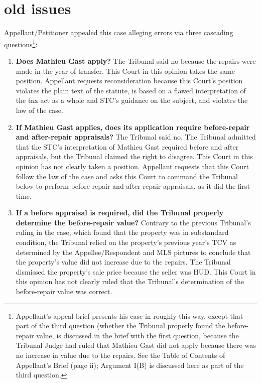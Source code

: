 \documentclass[12pt,\documentclassflag]{michiganCourtOfAppealsBrief}
\begin{document}
\section{old issues}

Appellant/Petitioner appealed this case alleging errors via three cascading questions\footnote{Appellant's appeal brief presents his case in roughly this way, except that part of the third question (whether the Tribunal properly found the before-repair value, is discussed in the brief with the first question, because the Tribunal Judge had ruled that Mathieu Gast did not apply because there was no increase in value due to the repairs. See the Table of Contents of Appellant's Brief (page ii); Argument I(B) is discussed here as part of the third question.}:

\begin{enumerate}
\item \textbf{Does Mathieu Gast apply?}
  The Tribunal said no because the repairs were made in the year of transfer.
  This Court in this opinion takes the same position. Appellant requests reconsideration because this Court's position violates the plain text of the statute, is based on a flawed interpretation of the tax act as a whole and STC's guidance on the subject, and violates the law of the case.
\item \textbf{If Mathieu Gast applies, does its application require before-repair and after-repair appraisals?}
The Tribunal said no. The Tribunal admitted that the STC's interpretation of Mathieu Gast required before and after appraisals, but the Tribunal claimed the right to disagree. This Court in this opinion has not clearly taken a position. Appellant requests that this Court follow the law of the case and asks this Court to command the Tribunal below to perform before-repair and after-repair appraisals, as it did the first time.
\item \textbf{If a before appraisal is required, did the Tribunal properly determine the before-repair value?}
  Contrary to the previous Tribunal's ruling in the case, which found that the property was in substandard condition, the Tribunal relied on the property's previous year's TCV as determined by the Appellee/Respondent and MLS pictures to conclude that the property's value did not increase due to the repairs. The Tribunal dismissed the property's sale price because the seller was HUD. This Court in this opinion has not clearly ruled that the Tribunal's determination of the before-repair value was correct. 
\end{enumerate}
\end{document}
